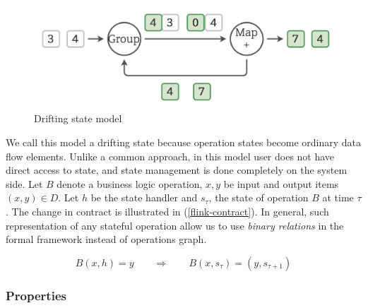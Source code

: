 \begin{figure}[htbp]
  \centering
  \includegraphics[width=.49\textwidth]{pics/classical-drifting2}
  \caption{Drifting state model}
  \label {classical-drifting2}
\end{figure}

We call this model a drifting state because operation states become ordinary data flow elements. Unlike a common approach, in this model user does not have direct access to state, and state management is done completely on the system side. Let $B$ denote a business logic operation, $x, y$ be input and output items $(x,y)\in D$. Let $h$ be the state handler and $s_\tau$, the state of operation $B$ at time $\tau$. The change in contract is illustrated in (\ref{flink-contract}). In general, such representation of any stateful operation allow us to use {\em binary relations} in the formal framework instead of operations graph.

\begin{equation}
  \label{flink-contract}
  B(x, h) = y \qquad\Longrightarrow\qquad B(x, s_{\tau}) = (y, s_{\tau+1}) 
\end{equation}

\subsubsection{Properties}

